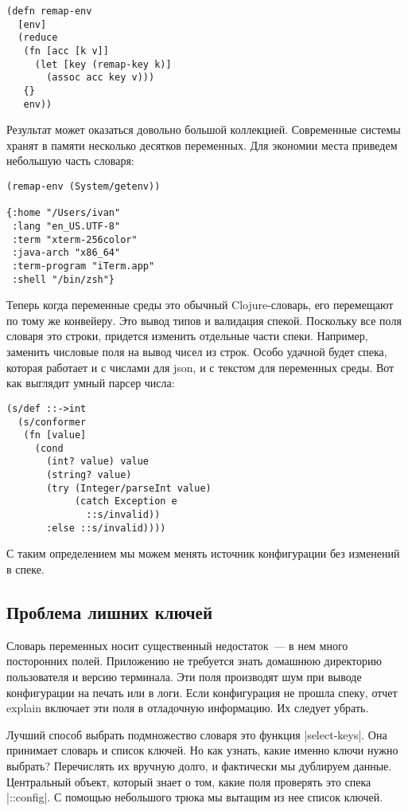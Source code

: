 \begin{verbatim}
(defn remap-env
  [env]
  (reduce
   (fn [acc [k v]]
     (let [key (remap-key k)]
       (assoc acc key v)))
   {}
   env))
\end{verbatim}

Результат может оказаться довольно большой коллекцией. Современные системы
хранят в памяти несколько десятков переменных. Для экономии места приведем
небольшую часть словаря:

\begin{verbatim}
(remap-env (System/getenv))

{:home "/Users/ivan"
 :lang "en_US.UTF-8"
 :term "xterm-256color"
 :java-arch "x86_64"
 :term-program "iTerm.app"
 :shell "/bin/zsh"}
\end{verbatim}

Теперь когда переменные среды это обычный Clojure-словарь, его перемещают по
тому же конвейеру. Это вывод типов и валидация спекой. Поскольку все поля
словаря это строки, придется изменить отдельные части спеки. Например, заменить
числовые поля на вывод чисел из строк. Особо удачной будет спека, которая
работает и с числами для json, и с текстом для переменных среды. Вот как
выглядит умный парсер числа:

\begin{verbatim}
(s/def ::->int
  (s/conformer
   (fn [value]
     (cond
       (int? value) value
       (string? value)
       (try (Integer/parseInt value)
            (catch Exception e
              ::s/invalid))
       :else ::s/invalid))))
\end{verbatim}

С таким определением мы можем менять источник конфигурации без изменений в
спеке.

\subsection{Проблема лишних ключей}

Словарь переменных носит существенный недостаток~--- в нем много посторонних
полей. Приложению не требуется знать домашнюю директорию пользователя и версию
терминала. Эти поля производят шум при выводе конфигурации на печать или в
логи. Если конфигурация не прошла спеку, отчет explain включает эти поля в
отладочную информацию. Их следует убрать.

Лучший способ выбрать подмножество словаря это функция \spverb|select-keys|. Она
принимает словарь и список ключей. Но как узнать, какие именно ключи нужно
выбрать? Перечислять их вручную долго, и фактически мы дублируем
данные. Центральный объект, который знает о том, какие поля проверять это спека
\spverb|::config|. С помощью небольшого трюка мы вытащим из нее список ключей.

